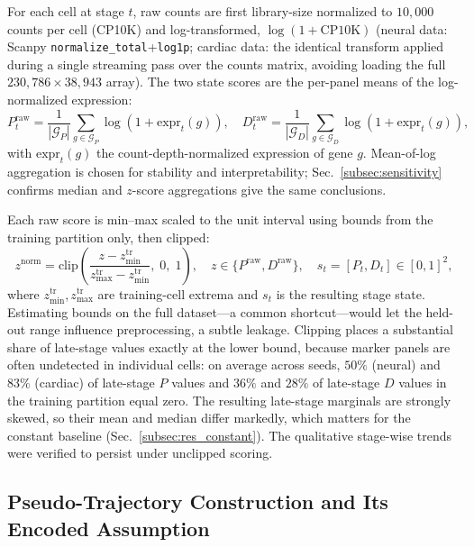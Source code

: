 \documentclass[pdflatex,sn-mathphys-num]{sn-jnl}
\theoremstyle{thmstyleone}%
\theoremstyle{thmstyletwo}%
\theoremstyle{thmstylethree}%
\begin{document}
For each cell at stage $t$, raw counts are first library-size normalized to $10{,}000$ counts per cell (CP10K) and log-transformed, $\log(1+\mathrm{CP10K})$ (neural data: Scanpy \texttt{normalize\_total}+\texttt{log1p}; cardiac data: the identical transform applied during a single streaming pass over the counts matrix, avoiding loading the full $230{,}786\times 38{,}943$ array). The two state scores are the per-panel means of the log-normalized expression:
\begin{equation}
P^{\mathrm{raw}}_t = \frac{1}{|\mathcal{G}_P|}\sum_{g\in\mathcal{G}_P}\log\!\left(1+\mathrm{expr}_t(g)\right), \quad
D^{\mathrm{raw}}_t = \frac{1}{|\mathcal{G}_D|}\sum_{g\in\mathcal{G}_D}\log\!\left(1+\mathrm{expr}_t(g)\right),
\label{eq:marker_scores}
\end{equation}
with $\mathrm{expr}_t(g)$ the count-depth-normalized expression of gene $g$. Mean-of-log aggregation is chosen for stability and interpretability; Sec.~\ref{subsec:sensitivity} confirms median and $z$-score aggregations give the same conclusions.

Each raw score is min--max scaled to the unit interval using bounds from the training partition only, then clipped:
\begin{equation}
z^{\mathrm{norm}} = \mathrm{clip}\!\left(\frac{z - z_{\min}^{\mathrm{tr}}}{z_{\max}^{\mathrm{tr}} - z_{\min}^{\mathrm{tr}}},\;0,\;1\right), \quad z\in\{P^{\mathrm{raw}},D^{\mathrm{raw}}\}, \quad s_t=[P_t,D_t]\in[0,1]^2,
\label{eq:minmax_clip}
\end{equation}
where $z_{\min}^{\mathrm{tr}},z_{\max}^{\mathrm{tr}}$ are training-cell extrema and $s_t$ is the resulting stage state. Estimating bounds on the full dataset---a common shortcut---would let the held-out range influence preprocessing, a subtle leakage. Clipping places a substantial share of late-stage values exactly at the lower bound, because marker panels are often undetected in individual cells: on average across seeds, $50\%$ (neural) and $83\%$ (cardiac) of late-stage $P$ values and $36\%$ and $28\%$ of late-stage $D$ values in the training partition equal zero. The resulting late-stage marginals are strongly skewed, so their mean and median differ markedly, which matters for the constant baseline (Sec.~\ref{subsec:res_constant}). The qualitative stage-wise trends were verified to persist under unclipped scoring.

\subsection{\textbf{Pseudo-Trajectory Construction and Its Encoded Assumption}}
\label{subsec:traj}
\end{document}
